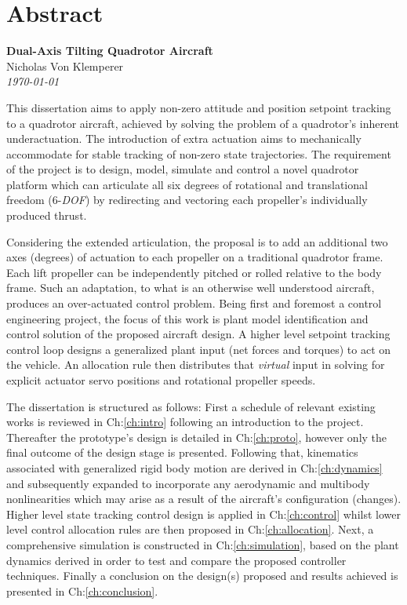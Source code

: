 \documentclass[a4paper, 11pt, oneside, openright, parskip=full]{book}
\newcommand{\auth}{Nicholas Von Klemperer}								%
\newcommand{\titl}{Dual-Axis Tilting Quadrotor Aircraft}						%
\begin{document}
\chapter{Abstract}				
\label{ch:abs}
\begin{center}
	\textbf{\Large \titl}\\
			\vskip 0.2cm
			\auth\\
			\vskip 0.2cm
	\textit{\footnotesize\today}
			\vskip 1cm
\end{center}
This dissertation aims to apply non-zero attitude and position setpoint tracking to a quadrotor aircraft, achieved by solving the problem of a quadrotor's inherent underactuation. The introduction of extra actuation aims to mechanically accommodate for stable tracking of non-zero state trajectories. The requirement of the project is to design, model, simulate and control a novel quadrotor platform which can articulate all six degrees of rotational and translational freedom (6-\emph{DOF}) by redirecting and vectoring each propeller's individually produced thrust. 
\par
Considering the extended articulation, the proposal is to add an additional two axes (degrees) of actuation to each propeller on a traditional quadrotor frame. Each lift propeller can be independently pitched or rolled relative to the body frame. Such an adaptation, to what is an otherwise well understood aircraft, produces an over-actuated control problem. Being first and foremost a control engineering project, the focus of this work is plant model identification and control solution of the proposed aircraft design. A higher level setpoint tracking control loop designs a generalized plant input (net forces and torques) to act on the vehicle. An allocation rule then distributes that \emph{virtual} input in solving for explicit actuator servo positions and rotational propeller speeds.
\par
The dissertation is structured as follows: First a schedule of relevant existing works is reviewed in Ch:\ref{ch:intro} following an introduction to the project. Thereafter the prototype's design is detailed in Ch:\ref{ch:proto}, however only the final outcome of the design stage is presented. Following that, kinematics associated with generalized rigid body motion are derived in Ch:\ref{ch:dynamics} and subsequently expanded to incorporate any aerodynamic and multibody nonlinearities which may arise as a result of the aircraft's configuration (changes). Higher level state tracking control design is applied in Ch:\ref{ch:control} whilst lower level control allocation rules are then proposed in Ch:\ref{ch:allocation}. Next, a comprehensive simulation is constructed in Ch:\ref{ch:simulation}, based on the plant dynamics derived in order to test and compare the proposed controller techniques. Finally a conclusion on the design(s) proposed and results achieved is presented in Ch:\ref{ch:conclusion}.
\end{document}
